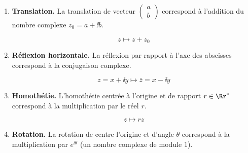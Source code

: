 \documentclass[11pt,class=report,crop=false]{standalone}
\begin{document}
\begin{enumerate}
	\item \textbf{Translation.}
	La translation de vecteur $\left(\begin{smallmatrix}a\\b\end{smallmatrix}\right)$ correspond à l'addition du nombre complexe $z_0 = a + \ii b$.
	
	\begin{center}		
	\begin{minipage}{0.45\textwidth}
    $$z \mapsto z + z_0$$
	\end{minipage}
	\begin{minipage}{0.45\textwidth}
	\end{minipage}
	\end{center}

	\item \textbf{Réflexion horizontale.}
	La réflexion par rapport à l'axe des abscisses correspond à la conjugaison complexe.

	\begin{center}
	\begin{minipage}{0.45\textwidth}
		$$z = x + \ii y \mapsto \bar z = x - \ii y$$
	\end{minipage}
	\begin{minipage}{0.45\textwidth}
	\end{minipage}
	\end{center}

	\item \textbf{Homothétie.}
   L'homothétie centrée à l'origine et de rapport $r \in \Rr^*$ correspond à la multiplication par le réel $r$.
   
   \begin{center}
	\begin{minipage}{0.45\textwidth}
	$$z \mapsto rz$$	
	\end{minipage}
	\begin{minipage}{0.45\textwidth}
	\end{minipage}	
	\end{center}

	\item \textbf{Rotation.}
	La rotation de centre l'origine et d'angle $\theta$ correspond à la multiplication par $e^{\ii \theta}$ (un nombre complexe de module $1$).
	

\end{enumerate}
\end{document}
